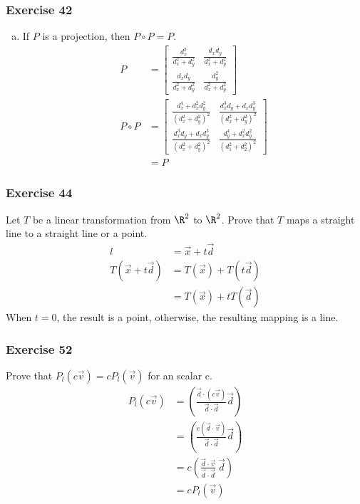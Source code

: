 \documentclass[letterpaper, 12pt]{math}
\begin{document}
\subsubsection*{Exercise 42}
\begin{enumerate}[(a)]
  \item If \( P \) is a projection, then \( P\circ P = P \).
  \begin{align*}
    P &= \begin{bmatrix}
      \frac{d_x^2}{d_x^2+d_y^2} & \frac{d_xd_y}{d_x^2+d_y^2} \\[0.25em]
      \frac{d_xd_y}{d_x^2+d_y^2} & \frac{d_y^2}{d_x^2+d_y^2}
    \end{bmatrix} \\
    P\circ P &= \begin{bmatrix}
      \frac{d_x^4+d_x^2d_y^2}{(d_x^2+d_y^2)^2} &
        \frac{d_x^3d_y+d_xd_y^3}{(d_x^2+d_y^2)^2} \\[0.25em]
      \frac{d_x^3d_y+d_xd_y^3}{(d_x^2+d_y^2)^2} &
        \frac{d_y^4+d_x^2d_y^2}{(d_1^2+d_2^2)^2}
    \end{bmatrix} \\
    &= P
  \end{align*}
\end{enumerate}

\subsubsection*{Exercise 44}
Let \( T \) be a linear transformation from \( \R^2 \) to \( \R^2 \). Prove
that \( T \) maps a straight line to a straight line or a point.
\begin{align*}
  l &= \vec{x}+t\vec{d} \\
  T(\vec{x}+t\vec{d}) &= T(\vec{x})+T(t\vec{d}) \\
  &= T(\vec{x})+tT(\vec{d})
\end{align*}
When \( t = 0 \), the result is a point, otherwise, the resulting mapping is
a line.

\subsubsection*{Exercise 52}
Prove that \( P_l(c\vec{v}) = cP_l(\vec{v}) \) for an scalar c.
\begin{align*}
  P_l(c\vec{v}) &=
    \left(\frac{\vec{d}\cdot(c\vec{v})}{\vec{d}\cdot\vec{d}}\vec{d}\right) \\
  &= \left(\frac{c(\vec{d}\cdot\vec{v})}{\vec{d}\cdot\vec{d}}\vec{d}\right) \\
  &= c\left(\frac{\vec{d}\cdot\vec{v}}{\vec{d}\cdot\vec{d}}~\vec{d}\right) \\
  &= cP_l(\vec{v})
\end{align*}
\end{document}
